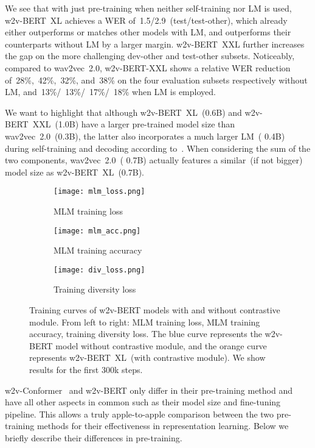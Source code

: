 \documentclass{article}
\begin{document}
We see that with just pre-training when neither self-training nor LM is used, w2v-BERT~XL achieves a WER of~1.5/2.9~(test/test-other), which already either outperforms or matches other models with LM, and outperforms their counterparts without LM by a larger margin.
w2v-BERT~XXL further increases the gap on the more challenging dev-other and test-other subsets.
Noticeably, compared to wav2vec~2.0, w2v-BERT-XXL shows a relative WER reduction of~28\%,~42\%,~32\%, and~38\% on the four evaluation subsets respectively without LM, and~13\%/~13\%/~17\%/~18\% when LM is employed.

We want to highlight that although w2v-BERT~XL~(0.6B) and w2v-BERT~XXL~(1.0B) have a larger pre-trained model size than wav2vec~2.0~(0.3B), the latter also incorporates a much larger LM~( 0.4B) during self-training and decoding according to~\cite{xu2021self,baevski2020wav2vec}.
When considering the sum of the two components, wav2vec~2.0~( 0.7B) actually features a similar~(if not bigger) model size as w2v-BERT~XL~(0.7B).


\begin{figure*}[htbp]
  \centering
  \begin{subfigure}[b]{0.325\textwidth}
    \centering
    \texttt{[image: mlm\_loss.png]}
    \caption{MLM training loss}
    \label{fig:mlm_loss}
  \end{subfigure}
  \hfill
  \begin{subfigure}[b]{0.33\textwidth}
    \centering
    \texttt{[image: mlm\_acc.png]}
    \caption{MLM training accuracy}
    \label{fig:mlm_acc}
  \end{subfigure}
  \hfill
  \begin{subfigure}[b]{0.33\textwidth}
    \centering
    \texttt{[image: div\_loss.png]}
    \caption{Training diversity loss}
    \label{fig:div_loss}
  \end{subfigure}
  \caption{Training curves of w2v-BERT models with and without contrastive module. From left to right: MLM training loss, MLM training accuracy, training diversity loss. The blue curve represents the w2v-BERT model without contrastive module, and the orange curve represents w2v-BERT~XL~(with contrastive module). We show results for the first 300k steps.}
  \label{fig:learning_curves}
\end{figure*}


w2v-Conformer~\cite{zhang2020pushing} and w2v-BERT only differ in their pre-training method and have all other aspects in common such as their model size and fine-tuning pipeline.
This allows a truly apple-to-apple comparison between the two pre-training methods for their effectiveness in representation learning.
Below we briefly describe their differences in pre-training.
\end{document}
